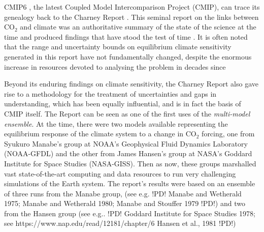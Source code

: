 \documentclass[gmd,manuscript]{copernicus}
\begin{document}
CMIP6 \citep{ref:eyringetal2016a}, the latest Coupled Model
Intercomparison Project (CMIP), can trace its genealogy back to the
Charney Report \citep{ref:charneyetal1979}. This seminal report on the
links between CO$_2$ and climate was an authoritative summary of the
state of the science at the time and produced findings that have
stood the test of time \citep{ref:bonyetal2013}. It is often noted
\citep[see, e.g][]{ref:andrewsetal2012}
that the range and uncertainty bounds on equilibrium climate
sensitivity generated in this report have not fundamentally changed,
despite the enormous increase in resources devoted to analysing the
problem in decades since \citep[see, e.g][]{ref:knuttietal2017}

Beyond its
enduring findings on climate sensitivity, the Charney Report also gave
rise to a methodology for the treatment of uncertainties and gaps in
understanding, which has been equally influential, and is in fact the
basis of CMIP itself. The Report can be seen as one of the first uses
of the \emph{multi-model ensemble}. At the time, there were two models
available
representing the equilibrium response of the
climate system to a change in CO$_2$ forcing, one from Syukuro
Manabe's group at NOAA's Geophysical Fluid Dynamics Laboratory (NOAA-GFDL) and
the other from James Hansen's group at NASA's Goddard Institute for
Space Studies (NASA-GISS). Then as now, these groups marshalled vast
state-of-the-art computing and data resources to run very challenging
simulations of the Earth system. The report's results were based on an
ensemble of
three runs from the Manabe group, (see e.g. !PD! Manabe and Wetherald 1975; %
Manabe and Wetherald 1980; %
Manabe and Stouffer 1979 %
!PD!)
and two from the Hansen group (see e.g.. !PD! Goddard Institute for Space Studies 1978; see https://www.nap.edu/read/12181/chapter/6
Hansen et al., 1981 %
!PD!)
\end{document}

